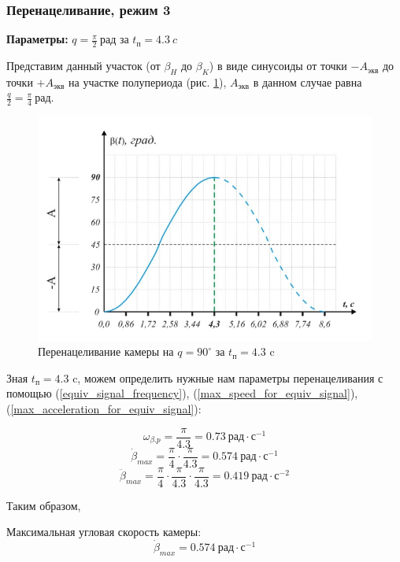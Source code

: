 \subsubsection{Перенацеливание, режим 3}

\textbf{Параметры:} $q = \frac{\pi}{2} ~\textit{рад}$ за $t_\textit{п} = 4.3 ~\textit{c}$

Представим данный участок (от $\beta_{H}$ до $\beta_{K}$) в виде синусоиды от точки
$-A_\textit{экв}$ до точки $+A_\textit{экв}$ на участке полупериода
(рис. \ref{retarget_90grad_4,3sec}), $A_\textit{экв}$ в данном случае
равна $\frac{q}{2} = \frac{\pi}{4} ~\textit{рад}$.

\begin{figure}[ht!]
    \centering
    \includegraphics[keepaspectratio]{./src/pictures/retarget_equivalent_input_signals/90grad_4,3sec}
    \caption{Перенацеливание камеры на $q = 90^{\circ}$ за $t_\textit{п} = 4.3$ c}
    \label{retarget_90grad_4,3sec}
\end{figure}

Зная $t_{\textit{п} } = 4.3$ c, можем определить нужные нам параметры перенацеливания
с помощью (\ref{equiv_signal_frequency}),
(\ref{max_speed_for_equiv_signal}),
(\ref{max_acceleration_for_equiv_signal}):

$$
    \omega_{\beta.p} = \frac{\pi}{4.3} = 0.73 ~\textit{рад} \cdot \textit{с}^{-1}
$$
$$
    \dot{\beta}_{max} = \frac{\pi}{4} \cdot \frac{\pi}{4.3} = 0.574 ~\textit{рад} \cdot \textit{с}^{-1}
$$
$$
    \ddot{\beta}_{max} = \frac{\pi}{4} \cdot \frac{\pi}{4.3} \cdot \frac{\pi}{4.3} = 0.419 ~\textit{рад} \cdot \textit{с}^{-2}
$$

Таким образом,

Максимальная угловая скорость камеры:
\begin{equation}
    \dot{\beta}_{max} = 0.574 ~\textit{рад} \cdot \textit{с}^{-1}
\end{equation}

